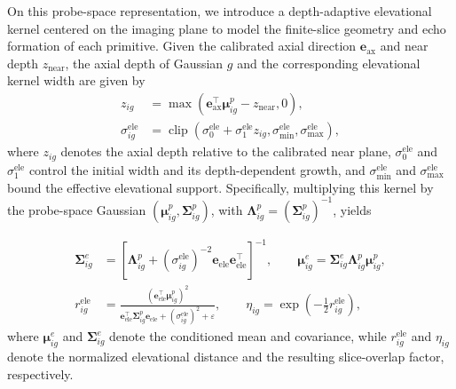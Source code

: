 On this probe-space representation, we introduce a depth-adaptive elevational
kernel centered on the imaging plane to model the finite-slice geometry and
echo formation of each primitive. Given the calibrated axial direction
$\mathbf e_{\mathrm{ax}}$ and near depth $z_{\mathrm{near}}$, the axial depth
of Gaussian $g$ and the corresponding elevational kernel width are given by
\begin{equation}
\begin{aligned}
z_{ig}
&=
\max
\left(
\mathbf e_{\mathrm{ax}}^\top
\boldsymbol\mu^p_{ig}
-
z_{\mathrm{near}},
0
\right),\\
\sigma^{\mathrm{ele}}_{ig}
&=
\operatorname{clip}
\left(
\sigma^{\mathrm{ele}}_0
+
\sigma^{\mathrm{ele}}_1 z_{ig},
\sigma^{\mathrm{ele}}_{\min},
\sigma^{\mathrm{ele}}_{\max}
\right),
\end{aligned}
\label{eq:depth-adaptive-ele-width}
\end{equation}
where $z_{ig}$ denotes the axial depth relative to the calibrated near plane,
$\sigma^{\mathrm{ele}}_0$ and $\sigma^{\mathrm{ele}}_1$ control the initial
width and its depth-dependent growth, and
$\sigma^{\mathrm{ele}}_{\min}$ and $\sigma^{\mathrm{ele}}_{\max}$ bound the
effective elevational support. Specifically, multiplying this kernel by the
probe-space Gaussian
$(\boldsymbol\mu^{p}_{ig},\boldsymbol\Sigma^{p}_{ig})$, with
$\boldsymbol\Lambda^{p}_{ig}
=(\boldsymbol\Sigma^{p}_{ig})^{-1}$, yields

\begin{equation}
\begin{aligned}
\boldsymbol\Sigma^{e}_{ig}
&=
\left[
\boldsymbol\Lambda^{p}_{ig}
+
\left(\sigma^{\mathrm{ele}}_{ig}\right)^{-2}
\mathbf e_{\mathrm{ele}}
\mathbf e_{\mathrm{ele}}^\top
\right]^{-1},
\qquad
\boldsymbol\mu^{e}_{ig}
=
\boldsymbol\Sigma^{e}_{ig}
\boldsymbol\Lambda^{p}_{ig}
\boldsymbol\mu^{p}_{ig},
\\
r^{\mathrm{ele}}_{ig}
&=
\frac{
\left(
\mathbf e_{\mathrm{ele}}^\top
\boldsymbol\mu^{p}_{ig}
\right)^2
}{
\mathbf e_{\mathrm{ele}}^\top
\boldsymbol\Sigma^{p}_{ig}
\mathbf e_{\mathrm{ele}}
+
\left(\sigma^{\mathrm{ele}}_{ig}\right)^2
+
\varepsilon
},
\qquad
\eta_{ig}
=
\exp
\left(
-\frac{1}{2}r^{\mathrm{ele}}_{ig}
\right),
\end{aligned}
\label{eq:elevational-conditioned-attributes}
\end{equation}
where $\boldsymbol\mu^{e}_{ig}$ and
$\boldsymbol\Sigma^{e}_{ig}$ denote the conditioned mean and covariance,
while $r^{\mathrm{ele}}_{ig}$ and $\eta_{ig}$ denote the normalized
elevational distance and the resulting slice-overlap factor, respectively.

